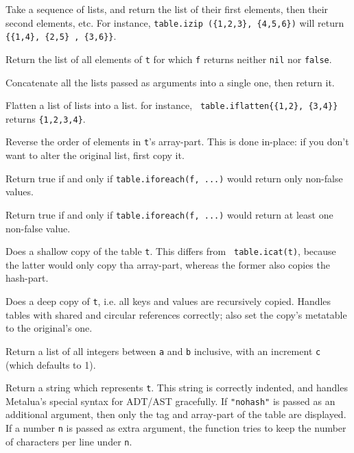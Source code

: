 
Take a sequence of lists, and return the
list of their first elements, then their second elements, etc. For
instance, {\tt table.izip (\{1,2,3\}, \{4,5,6\})} will return
{\tt\{\{1,4\}, \{2,5\} , \{3,6\}\}}.


Return the list of all elements of {\tt t} for which {\tt f} returns
neither {\tt nil} nor {\tt false}.


Concatenate all the lists passed as arguments into a single one, then
return it.


Flatten a list of lists into a list. for instance, {\tt
  table.iflatten\{\{1,2\}, \{3,4\}\}} returns {\tt\{1,2,3,4\}}.

Reverse the order of elements in {\tt t}'s array-part. This is done
in-place: if you don't want to alter the original list, first copy
it.


Return true if and only if {\tt table.iforeach(f, ...)} would return only
non-false values.


Return true if and only if {\tt table.iforeach(f, ...)} would return
at least one non-false value.


Does a shallow copy of the table {\tt t}. This differs from {\tt
  table.icat(t)}, because the latter would only copy tha array-part,
whereas the former also copies the hash-part.


Does a deep copy of {\tt t}, i.e. all keys and values are recursively
copied. Handles tables with shared and circular references correctly;
also set the copy's metatable to the original's one.


Return a list of all integers between {\tt a} and {\tt b} inclusive,
with an increment {\tt c} (which defaults to 1).


Return a string which represents {\tt t}. This string is correctly
indented, and handles Metalua's special syntax for ADT/AST
gracefully. If {\tt"nohash"} is passed as an additional argument, then
only the tag and array-part of the table are displayed. If a number
{\tt n} is passed as extra argument, the function tries to keep the
number of characters per line under {\tt n}.

